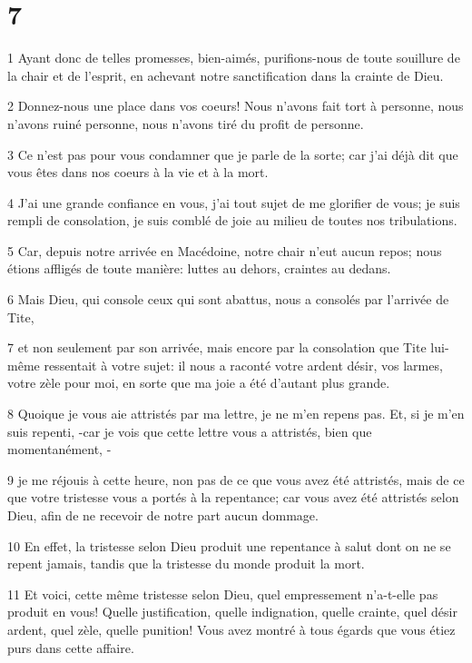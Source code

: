 \chapter{7}

\par 1 Ayant donc de telles promesses, bien-aimés, purifions-nous de toute souillure de la chair et de l'esprit, en achevant notre sanctification dans la crainte de Dieu.
\par 2 Donnez-nous une place dans vos coeurs! Nous n'avons fait tort à personne, nous n'avons ruiné personne, nous n'avons tiré du profit de personne.
\par 3 Ce n'est pas pour vous condamner que je parle de la sorte; car j'ai déjà dit que vous êtes dans nos coeurs à la vie et à la mort.
\par 4 J'ai une grande confiance en vous, j'ai tout sujet de me glorifier de vous; je suis rempli de consolation, je suis comblé de joie au milieu de toutes nos tribulations.
\par 5 Car, depuis notre arrivée en Macédoine, notre chair n'eut aucun repos; nous étions affligés de toute manière: luttes au dehors, craintes au dedans.
\par 6 Mais Dieu, qui console ceux qui sont abattus, nous a consolés par l'arrivée de Tite,
\par 7 et non seulement par son arrivée, mais encore par la consolation que Tite lui-même ressentait à votre sujet: il nous a raconté votre ardent désir, vos larmes, votre zèle pour moi, en sorte que ma joie a été d'autant plus grande.
\par 8 Quoique je vous aie attristés par ma lettre, je ne m'en repens pas. Et, si je m'en suis repenti, -car je vois que cette lettre vous a attristés, bien que momentanément, -
\par 9 je me réjouis à cette heure, non pas de ce que vous avez été attristés, mais de ce que votre tristesse vous a portés à la repentance; car vous avez été attristés selon Dieu, afin de ne recevoir de notre part aucun dommage.
\par 10 En effet, la tristesse selon Dieu produit une repentance à salut dont on ne se repent jamais, tandis que la tristesse du monde produit la mort.
\par 11 Et voici, cette même tristesse selon Dieu, quel empressement n'a-t-elle pas produit en vous! Quelle justification, quelle indignation, quelle crainte, quel désir ardent, quel zèle, quelle punition! Vous avez montré à tous égards que vous étiez purs dans cette affaire.
